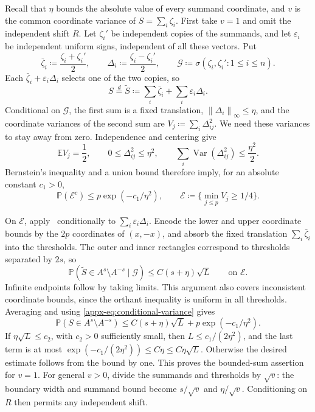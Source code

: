 \documentclass[11pt,letterpaper]{article}
\theoremstyle{remark}
\newcommand{\E}{\mathbb E}
\newcommand{\Pp}{\mathbb P}
\newcommand{\Var}{\operatorname{Var}}
\newcommand{\norm}[1]{\left\lVert#1\right\rVert}
\begin{document}
Recall that \(\eta\) bounds the absolute value of every summand
coordinate, and \(v\) is the common coordinate variance of
\(S=\sum_i\zeta_i\). First take \(v=1\) and omit the independent
shift \(R\). Let
\(\zeta_i'\) be independent copies of the summands, and let
\(\varepsilon_i\) be independent uniform signs, independent of all
these vectors. Put
\[
 \bar\zeta_i\coloneqq \frac{\zeta_i+\zeta_i'}2,\qquad
 \Delta_i\coloneqq \frac{\zeta_i-\zeta_i'}2,\qquad
 \mathcal G\coloneqq \sigma(\zeta_i,\zeta_i':1\le i\le n).
\]
Each \(\bar\zeta_i+\varepsilon_i\Delta_i\) selects one of the two copies, so
\begin{equation}
 S\stackrel d=\widetilde S\coloneqq \sum_i\bar\zeta_i+\sum_i\varepsilon_i\Delta_i.
 \label{appx-eq:pair-representation}
\end{equation}
Conditional on \(\mathcal G\), the first sum is a fixed translation,
\(\norm{\Delta_i}_\infty\le\eta\), and the coordinate variances of the
second sum are \(V_j\coloneqq \sum_i\Delta_{ij}^2\). We need these variances to
stay away from zero. Independence and centering give
\[
 \E V_j=\frac12,\qquad
 0\le\Delta_{ij}^2\le\eta^2,\qquad
 \sum_i\Var(\Delta_{ij}^2)\le\frac{\eta^2}{2}.
\]
Bernstein's inequality and a union bound therefore imply, for an
absolute constant \(c_1>0\),
\begin{equation}
 \Pp(\mathcal E^c)\le p\exp(-c_1/\eta^2),
 \qquad \mathcal E\coloneqq \{\min_{j\le p}V_j\ge1/4\}.
 \label{appx-eq:conditional-variance}
\end{equation}

On \(\mathcal E\), apply~\cite[Lemma~J.4]{CCKK2022} conditionally to
\(\sum_i\varepsilon_i\Delta_i\). Encode the lower and upper coordinate
bounds by the \(2p\) coordinates of \((x,-x)\), and absorb the fixed
translation \(\sum_i\bar\zeta_i\) into the thresholds. The outer and inner
rectangles correspond to thresholds separated by \(2s\), so
\[
 \Pp(\widetilde S\in A^{s}\setminus A^{-s}\mid\mathcal G)
 \le C(s+\eta)\sqrt L\qquad\text{on }\mathcal E.
\]
Infinite endpoints follow by taking limits. This argument also covers
inconsistent coordinate bounds, since the orthant inequality is uniform
in all thresholds. Averaging and using
\eqref{appx-eq:conditional-variance} gives
\begin{equation}
 \Pp(S\in A^{s}\setminus A^{-s})
 \le C(s+\eta)\sqrt L+p\exp(-c_1/\eta^2).
 \label{appx-eq:concentration-pairs}
\end{equation}
If \(\eta\sqrt L\le c_2\), with \(c_2>0\) sufficiently small, then
\(L\le c_1/(2\eta^2)\), and the last term is at most
\(\exp(-c_1/(2\eta^2))\le C\eta\le C\eta\sqrt L\).
Otherwise the desired estimate follows from the bound by one.
This proves the bounded-sum assertion for \(v=1\). For general
\(v>0\), divide the summands and thresholds by \(\sqrt v\): the
boundary width and summand bound become \(s/\sqrt v\) and
\(\eta/\sqrt v\). Conditioning on \(R\) then permits any independent
shift.
\end{document}
